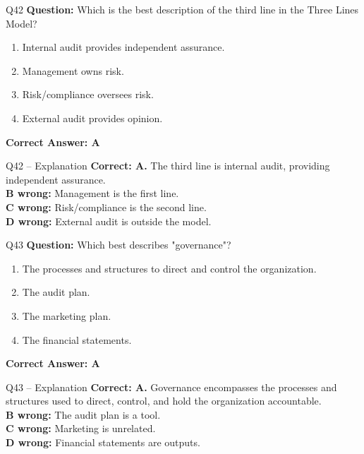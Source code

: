 \documentclass[aspectratio=169,10pt]{beamer}
\begin{document}
	\begin{frame}[t]{Q42}
		\small
		\textbf{Question:} Which is the best description of the third line in the Three Lines Model?
		\begin{enumerate}[label=\Alph*.,itemsep=1pt,topsep=2pt]
			\item Internal audit provides independent assurance.
			\item Management owns risk.
			\item Risk/compliance oversees risk.
			\item External audit provides opinion.
		\end{enumerate}
		\vspace{4pt}
		\textbf{Correct Answer: A}
	\end{frame}
	
	\begin{frame}[t]{Q42 -- Explanation}
		\small
		\textbf{Correct: A.} The third line is internal audit, providing independent assurance. \\[4pt]
		\textbf{B wrong:} Management is the first line. \\[2pt]
		\textbf{C wrong:} Risk/compliance is the second line. \\[2pt]
		\textbf{D wrong:} External audit is outside the model.
	\end{frame}
	
	\begin{frame}[t]{Q43}
		\small
		\textbf{Question:} Which best describes "governance"?
		\begin{enumerate}[label=\Alph*.,itemsep=1pt,topsep=2pt]
			\item The processes and structures to direct and control the organization.
			\item The audit plan.
			\item The marketing plan.
			\item The financial statements.
		\end{enumerate}
		\vspace{4pt}
		\textbf{Correct Answer: A}
	\end{frame}
	
	\begin{frame}[t]{Q43 -- Explanation}
		\small
		\textbf{Correct: A.} Governance encompasses the processes and structures used to direct, control, and hold the organization accountable. \\[4pt]
		\textbf{B wrong:} The audit plan is a tool. \\[2pt]
		\textbf{C wrong:} Marketing is unrelated. \\[2pt]
		\textbf{D wrong:} Financial statements are outputs.
	\end{frame}
	
\end{document}
